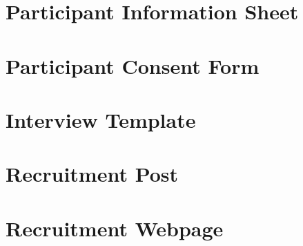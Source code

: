 \documentclass[11pt
              , a4paper
             , twoside
              , openright
              ]{report}
\begin{document}
\chapter{Participant Information Sheet}

\chapter{Participant Consent Form}

\chapter{Interview Template}

\chapter{Recruitment Post}

\chapter{Recruitment Webpage}

\end{document}

